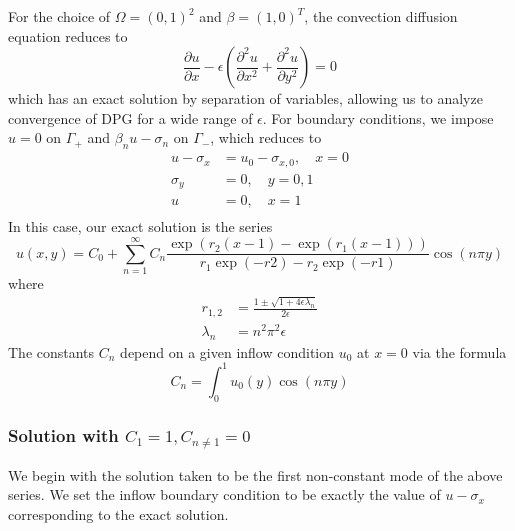 \documentclass[11pt,onecolumn]{scrartcl}
\newcommand{\pd}[2]{\frac{\partial#1}{\partial#2}}
\newcommand{\pdd}[2]{\frac{\partial^2#1}{\partial#2^2}}
\begin{document}
For the choice of $\Omega = (0,1)^2$ and $\beta = (1,0)^T$, the convection diffusion equation reduces to
\[
\pd{u}{x} - \epsilon \left(\pdd{u}{x}+ \pdd{u}{y}\right) = 0
\]
which has an exact solution by separation of variables, allowing us to analyze convergence of DPG for a wide range of $\epsilon$.  For boundary conditions, we impose $u=0$ on $\Gamma_+$ and $\beta_n u - \sigma_n$ on $\Gamma_-$, which reduces to
\begin{align*}
u-\sigma_x &= u_0-\sigma_{x,0}, \quad x=0\\
\sigma_y &=  0, \quad y=0,1\\
u &= 0, \quad x=1\\
\end{align*}
In this case, our exact solution is the series
\[
u(x,y) = C_0 + \sum_{n=1}^\infty C_n \frac{\exp(r_2(x-1)-\exp(r_1(x-1)))}{r_1\exp(-r2) - r_2\exp(-r1)}\cos(n\pi y)
\]
where
\begin{align*}
r_{1,2} &= \frac{1 \pm \sqrt{1 + 4 \epsilon\lambda_n}}{2 \epsilon}\\
\lambda_n &= n^2\pi^2 \epsilon
\end{align*}
The constants $C_n$ depend on a given inflow condition $u_0$ at $x=0$ via the formula
\[
C_n = \int_0^1 u_0(y) \cos(n\pi y)
\]

\subsubsection{Solution with $C_1 = 1, C_{n\neq 1} = 0$}

We begin with the solution taken to be the first non-constant mode of the above series.  We set the inflow boundary condition to be exactly the value of $u-\sigma_x$ corresponding to the exact solution.  
\end{document}
